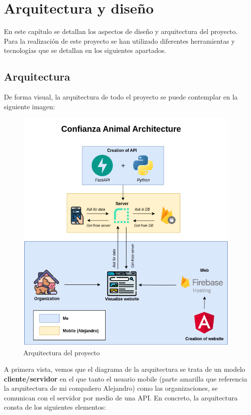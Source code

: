 \chapter{Arquitectura y diseño}\label{ch:arquitectura-y-diseno}

En este capítulo se detallan los aspectos de diseño y arquitectura del proyecto. Para la realización de este proyecto
se han utilizado diferentes herramientas y tecnologías que se detallan en los siguientes apartados.

\section{Arquitectura}\label{sec:arquitectura}

De forma visual, la arquitectura de todo el proyecto se puede contemplar en la siguiente imagen:

\begin{figure}[H]
    \centering
    \includegraphics[width=1\textwidth]{imgs/arquitectura2.png}
    \caption{Arquitectura del proyecto}
    \label{fig:arquitectura}
\end{figure}

A primera vista, vemos que el diagrama de la arquitectura se trata de un modelo
\textbf{cliente/servidor} en el que tanto el usuario mobile (parte amarilla que referencia la arquitectura de mi compañero Alejandro)
como las organizaciones, se comunican con el servidor por medio de una API. En concreto,
la arquitectura consta de los siguientes elementos:

